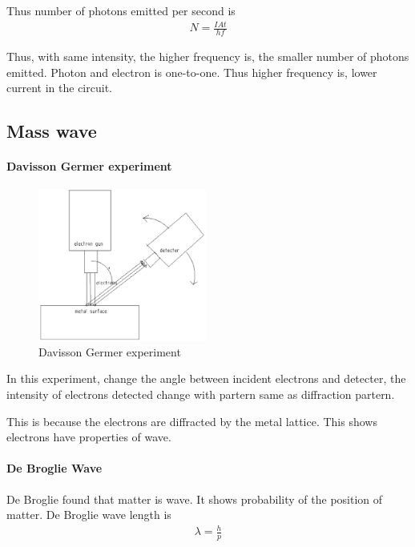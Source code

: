             Thus number of photons emitted per second is
            \begin{align}
                N = \frac{I A t}{h f}
            \end{align}

            Thus, with same intensity, the higher frequency is, the smaller number of photons emitted. Photon and electron is one-to-one. Thus higher frequency is, lower current in the circuit.

    \subsection{Mass wave}
        \paragraph{Davisson Germer experiment}
            \begin{figure}[H]
                \begin{center}
                    \includegraphics[height=5cm]{quantum_charts/dav_germ_exp.eps}
                \end{center}
                \caption{Davisson Germer experiment}
                \label{dav_germ_exp}
            \end{figure}

            In this experiment, change the angle between incident electrons and detecter, the intensity of electrons detected change with partern same as diffraction partern.

            This is because the electrons are diffracted by the metal lattice. This shows electrons have properties of wave.

        \paragraph{De Broglie Wave}
            De Broglie found that matter is wave. It shows probability of the position of matter. De Broglie wave length is
            \begin{align}
                \lambda = \frac{h}{p}
            \end{align}


